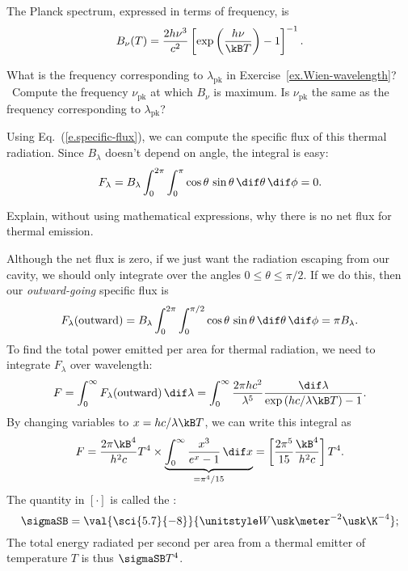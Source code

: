 The Planck spectrum, expressed in terms of frequency, is
\begin{equation}\label{e.planck-spectrum-frequency}
B_{\nu}(T) = \frac{2h\nu^{3}}{c^{2}} \left[\exp\left(\frac{h\nu}{\kB T}\right)-1\right]^{-1}.
\end{equation}

\begin{exercisebox}
What is the frequency corresponding to $\lambda_{\mathrm{pk}}$ in Exercise~\ref{ex.Wien-wavelength}? \notebook~Compute the frequency $\nu_{\mathrm{pk}}$ at which $B_{\nu}$ is maximum. Is $\nu_{\mathrm{pk}}$ the same as the frequency corresponding to $\lambda_{\mathrm{pk}}$?
\end{exercisebox}

Using Eq.~(\ref{e.specific-flux}), we can compute the specific flux of this thermal radiation. Since $B_{\lambda}$ doesn't depend on angle, the integral is easy:
\[ F_{\lambda} = B_{\lambda}\int_{0}^{2\pi}\int_{0}^{\pi}\cos\theta\,\sin\theta\,\dif\theta\,\dif\phi = 0. \]

\begin{exercisebox}
Explain, without using mathematical expressions, why there is no net flux for thermal emission.
\end{exercisebox}

Although the net flux is zero, if we just want the radiation escaping from our cavity, we should only integrate over the angles $0\le\theta\le\pi/2$. If we do this, then our \emph{outward-going} specific flux is
\begin{equation}\label{e.outward-thermal-flux}
 F_{\lambda}(\mathrm{outward}) = B_{\lambda}\int_{0}^{2\pi}\int_{0}^{\pi/2}\cos\theta\,\sin\theta\,\dif\theta\,\dif\phi = \pi B_{\lambda}.
\end{equation}
To find the total power emitted per area for thermal radiation, we need to integrate $F_{\lambda}$ over wavelength:
\begin{equation}\label{e.bolometric-thermal-flux}
F = \int_{0}^{\infty}F_{\lambda}(\mathrm{outward})\,\dif\lambda 
	= \int_{0}^{\infty} \frac{2\pi hc^{2}}{\lambda^{5}} \frac{\dif\lambda}{\exp\left(hc/\lambda\kB T\right)-1}.
\end{equation}
By changing variables to $x = hc/\lambda\kB T$, we can write this integral as
\[
	F = \frac{2\pi\kB^{4}}{h^{2}c}T^{4}\times \underbrace{\int_{0}^{\infty}\frac{x^{3}}{e^{x}-1}\,\dif x}_{=\pi^{4}/15} = \left[\frac{2\pi^{5}}{15}\frac{\kB^{4}}{h^{2}c}\right] T^{4}.
\]
The quantity in $\left[\cdot\right]$ is called the :
\[
	\sigmaSB = \val{\sci{5.7}{-8}}{\watt\usk\meter^{-2}\usk\K^{-4}};
\]
The total energy radiated per second per area from a thermal emitter of temperature $T$ is thus $\sigmaSB T^{4}$.

